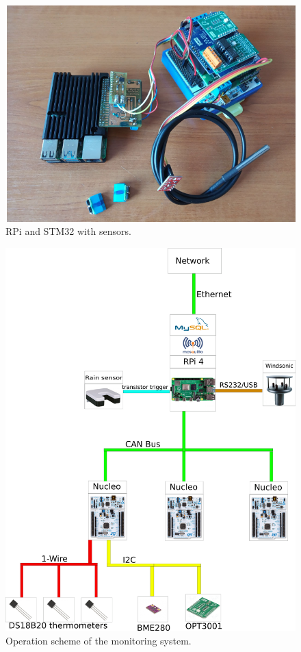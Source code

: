 \begin{figure}[H]
 \centering
 \includegraphics[scale = 0.38]{./pictures/Metostation}
 \caption{RPi and STM32 with sensors.}
 \label{MonNuc}
\end{figure}


\begin{figure}[H]
 \centering
 \includegraphics[scale = 0.25]{./pictures/monitoringScheme}
 \caption{Operation scheme of the monitoring system.}
 \label{opScheme}
\end{figure}




